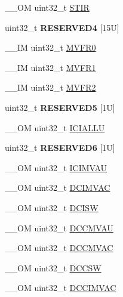 \begin{DoxyCompactItemize}
\item 
\+\_\+\+\_\+\+OM uint32\+\_\+t \mbox{\hyperlink{structSCB__Type_ad70825dd0869b7ccd07fb2b8680fcdb6}{S\+T\+IR}}
\item 
\mbox{\label{structSCB__Type_a4819f7ad316c10a458cd3a7ac86cbbee}} 
uint32\+\_\+t {\bfseries R\+E\+S\+E\+R\+V\+E\+D4} \mbox{[}15\+U\mbox{]}
\item 
\+\_\+\+\_\+\+IM uint32\+\_\+t \mbox{\hyperlink{structSCB__Type_a7a1ba0f875c0e97c1673882b1106e66b}{M\+V\+F\+R0}}
\item 
\+\_\+\+\_\+\+IM uint32\+\_\+t \mbox{\hyperlink{structSCB__Type_a75d6299150fdcbbcb765e22ff27c432e}{M\+V\+F\+R1}}
\item 
\+\_\+\+\_\+\+IM uint32\+\_\+t \mbox{\hyperlink{structSCB__Type_a280ef961518ecee3ed43a86404853c3d}{M\+V\+F\+R2}}
\item 
\mbox{\label{structSCB__Type_a82b68e5bbea29a5b307c22bca9332a0f}} 
uint32\+\_\+t {\bfseries R\+E\+S\+E\+R\+V\+E\+D5} \mbox{[}1\+U\mbox{]}
\item 
\+\_\+\+\_\+\+OM uint32\+\_\+t \mbox{\hyperlink{structSCB__Type_a573260e7836dbc43707df97dd475a0c8}{I\+C\+I\+A\+L\+LU}}
\item 
\mbox{\label{structSCB__Type_af417a59ef8e9e182f5b9d53e0c8e3211}} 
uint32\+\_\+t {\bfseries R\+E\+S\+E\+R\+V\+E\+D6} \mbox{[}1\+U\mbox{]}
\item 
\+\_\+\+\_\+\+OM uint32\+\_\+t \mbox{\hyperlink{structSCB__Type_a5eca5a3e5aedd89a9655df8f5798e2b0}{I\+C\+I\+M\+V\+AU}}
\item 
\+\_\+\+\_\+\+OM uint32\+\_\+t \mbox{\hyperlink{structSCB__Type_a4be79491ab1ed14f3b0237ba7e69063c}{D\+C\+I\+M\+V\+AC}}
\item 
\+\_\+\+\_\+\+OM uint32\+\_\+t \mbox{\hyperlink{structSCB__Type_a22bcfd7e1bffebdbe98cdbc8d77a2f42}{D\+C\+I\+SW}}
\item 
\+\_\+\+\_\+\+OM uint32\+\_\+t \mbox{\hyperlink{structSCB__Type_aae3caeea159ab54859ea11397f942cfa}{D\+C\+C\+M\+V\+AU}}
\item 
\+\_\+\+\_\+\+OM uint32\+\_\+t \mbox{\hyperlink{structSCB__Type_a042e3622c98de4e908cfda4f70d1f097}{D\+C\+C\+M\+V\+AC}}
\item 
\+\_\+\+\_\+\+OM uint32\+\_\+t \mbox{\hyperlink{structSCB__Type_ab95cc818be9fa7d25ae516f3fe6b7788}{D\+C\+C\+SW}}
\item 
\+\_\+\+\_\+\+OM uint32\+\_\+t \mbox{\hyperlink{structSCB__Type_a4f59813582b53feb5f1afbbad3db2022}{D\+C\+C\+I\+M\+V\+AC}}

\end{DoxyCompactItemize}
